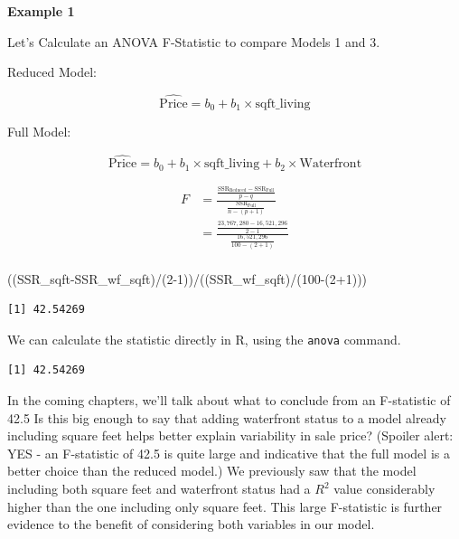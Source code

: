 \documentclass[
  letterpaper,
  DIV=11,
  numbers=noendperiod]{scrreprt}
\newenvironment{Shaded}{\begin{snugshade}}{\end{snugshade}}
\newcommand{\DecValTok}[1]{\textcolor[rgb]{0.68,0.00,0.00}{#1}}
\newcommand{\FunctionTok}[1]{\textcolor[rgb]{0.28,0.35,0.67}{#1}}
\newcommand{\NormalTok}[1]{\textcolor[rgb]{0.00,0.23,0.31}{#1}}
\newcommand{\SpecialCharTok}[1]{\textcolor[rgb]{0.37,0.37,0.37}{#1}}
\begin{document}
\textbf{Example 1}

Let's Calculate an ANOVA F-Statistic to compare Models 1 and 3.

Reduced Model:

\[
\widehat{\text{Price}}= b_0+ b_1 \times\text{sqft\_living}
\]

Full Model:

\[
\widehat{\text{Price}}= b_0+ b_1 \times\text{sqft\_living}+ b_2\times\text{Waterfront}
\]

\[
\begin{aligned}
F &= \frac{\frac{\text{SSR}_{\text{Reduced}}-\text{SSR}_{\text{Full}}}{p-q}}{\frac{\text{SSR}_{\text{Full}}}{n-(p+1)}} \\
&=\frac{\frac{23,767,280-16,521,296}{2-1}}{\frac{16,521,296}{100-(2+1)}} \\
\end{aligned}
\]

\begin{Shaded}
\begin{Highlighting}[]
\NormalTok{((SSR\_sqft}\SpecialCharTok{{-}}\NormalTok{SSR\_wf\_sqft)}\SpecialCharTok{/}\NormalTok{(}\DecValTok{2{-}1}\NormalTok{))}\SpecialCharTok{/}\NormalTok{((SSR\_wf\_sqft)}\SpecialCharTok{/}\NormalTok{(}\DecValTok{100}\SpecialCharTok{{-}}\NormalTok{(}\DecValTok{2}\SpecialCharTok{+}\DecValTok{1}\NormalTok{)))}
\end{Highlighting}
\end{Shaded}

\begin{verbatim}
[1] 42.54269
\end{verbatim}

We can calculate the statistic directly in R, using the \texttt{anova}
command.

\begin{Shaded}
\end{Shaded}

\begin{verbatim}
[1] 42.54269
\end{verbatim}

In the coming chapters, we'll talk about what to conclude from an
F-statistic of 42.5 Is this big enough to say that adding waterfront
status to a model already including square feet helps better explain
variability in sale price? (Spoiler alert: YES - an F-statistic of 42.5
is quite large and indicative that the full model is a better choice
than the reduced model.) We previously saw that the model including both
square feet and waterfront status had a \(R^2\) value considerably
higher than the one including only square feet. This large F-statistic
is further evidence to the benefit of considering both variables in our
model.
\end{document}
